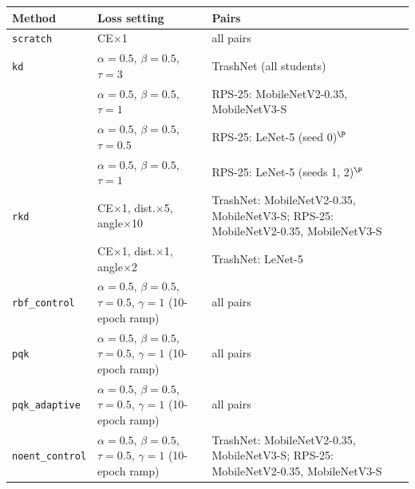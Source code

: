 \begin{tabular}{@{}lll@{}}
\toprule
Method & Loss setting & Pairs \\
\midrule
\texttt{scratch} & CE$\times$1 & all pairs \\
\texttt{kd} & $\alpha{=}0.5$, $\beta{=}0.5$, $\tau{=}3$ & TrashNet (all students) \\
 & $\alpha{=}0.5$, $\beta{=}0.5$, $\tau{=}1$ & RPS-25: MobileNetV2-0.35, MobileNetV3-S \\
 & $\alpha{=}0.5$, $\beta{=}0.5$, $\tau{=}0.5$ & RPS-25: LeNet-5 (seed 0)$^{\P}$ \\
 & $\alpha{=}0.5$, $\beta{=}0.5$, $\tau{=}1$ & RPS-25: LeNet-5 (seeds 1, 2)$^{\P}$ \\
\texttt{rkd} & CE$\times$1, dist.$\times$5, angle$\times$10 & TrashNet: MobileNetV2-0.35, MobileNetV3-S; RPS-25: MobileNetV2-0.35, MobileNetV3-S \\
 & CE$\times$1, dist.$\times$1, angle$\times$2 & TrashNet: LeNet-5 \\
\texttt{rbf\_control} & $\alpha{=}0.5$, $\beta{=}0.5$, $\tau{=}0.5$, $\gamma{=}1$ (10-epoch ramp) & all pairs \\
\texttt{pqk} & $\alpha{=}0.5$, $\beta{=}0.5$, $\tau{=}0.5$, $\gamma{=}1$ (10-epoch ramp) & all pairs \\
\texttt{pqk\_adaptive} & $\alpha{=}0.5$, $\beta{=}0.5$, $\tau{=}0.5$, $\gamma{=}1$ (10-epoch ramp) & all pairs \\
\texttt{noent\_control} & $\alpha{=}0.5$, $\beta{=}0.5$, $\tau{=}0.5$, $\gamma{=}1$ (10-epoch ramp) & TrashNet: MobileNetV2-0.35, MobileNetV3-S; RPS-25: MobileNetV2-0.35, MobileNetV3-S \\
\bottomrule
\end{tabular}
